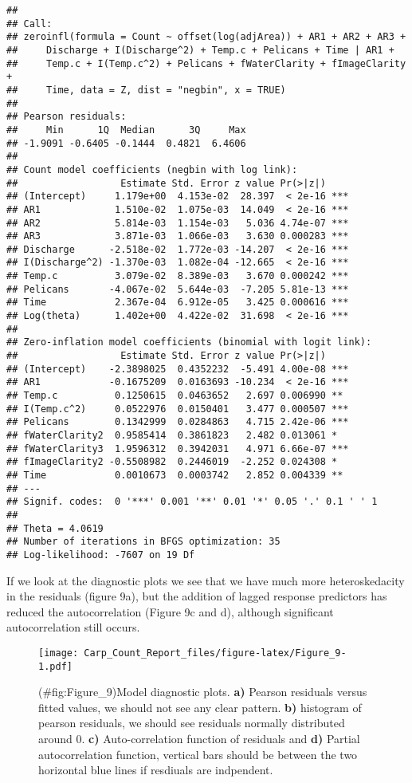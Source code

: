 \documentclass[]{article}
\begin{document}
\begin{verbatim}
## 
## Call:
## zeroinfl(formula = Count ~ offset(log(adjArea)) + AR1 + AR2 + AR3 + 
##     Discharge + I(Discharge^2) + Temp.c + Pelicans + Time | AR1 + 
##     Temp.c + I(Temp.c^2) + Pelicans + fWaterClarity + fImageClarity + 
##     Time, data = Z, dist = "negbin", x = TRUE)
## 
## Pearson residuals:
##     Min      1Q  Median      3Q     Max 
## -1.9091 -0.6405 -0.1444  0.4821  6.4606 
## 
## Count model coefficients (negbin with log link):
##                  Estimate Std. Error z value Pr(>|z|)    
## (Intercept)     1.179e+00  4.153e-02  28.397  < 2e-16 ***
## AR1             1.510e-02  1.075e-03  14.049  < 2e-16 ***
## AR2             5.814e-03  1.154e-03   5.036 4.74e-07 ***
## AR3             3.871e-03  1.066e-03   3.630 0.000283 ***
## Discharge      -2.518e-02  1.772e-03 -14.207  < 2e-16 ***
## I(Discharge^2) -1.370e-03  1.082e-04 -12.665  < 2e-16 ***
## Temp.c          3.079e-02  8.389e-03   3.670 0.000242 ***
## Pelicans       -4.067e-02  5.644e-03  -7.205 5.81e-13 ***
## Time            2.367e-04  6.912e-05   3.425 0.000616 ***
## Log(theta)      1.402e+00  4.422e-02  31.698  < 2e-16 ***
## 
## Zero-inflation model coefficients (binomial with logit link):
##                  Estimate Std. Error z value Pr(>|z|)    
## (Intercept)    -2.3898025  0.4352232  -5.491 4.00e-08 ***
## AR1            -0.1675209  0.0163693 -10.234  < 2e-16 ***
## Temp.c          0.1250615  0.0463652   2.697 0.006990 ** 
## I(Temp.c^2)     0.0522976  0.0150401   3.477 0.000507 ***
## Pelicans        0.1342999  0.0284863   4.715 2.42e-06 ***
## fWaterClarity2  0.9585414  0.3861823   2.482 0.013061 *  
## fWaterClarity3  1.9596312  0.3942031   4.971 6.66e-07 ***
## fImageClarity2 -0.5508982  0.2446019  -2.252 0.024308 *  
## Time            0.0010673  0.0003742   2.852 0.004339 ** 
## ---
## Signif. codes:  0 '***' 0.001 '**' 0.01 '*' 0.05 '.' 0.1 ' ' 1 
## 
## Theta = 4.0619 
## Number of iterations in BFGS optimization: 35 
## Log-likelihood: -7607 on 19 Df
\end{verbatim}

If we look at the diagnostic plots we see that we have much more
heteroskedacity in the residuals (figure 9a), but the addition of lagged
response predictors has reduced the autocorrelation (Figure 9c and d),
although significant autocorrelation still occurs.

\begin{figure}[htbp]
\centering
\texttt{[image: Carp\_Count\_Report\_files/figure-latex/Figure\_9-1.pdf]}
\caption{(\#fig:Figure\_9)Model diagnostic plots. \textbf{a)} Pearson
residuals versus fitted values, we should not see any clear pattern.
\textbf{b)} histogram of pearson residuals, we should see residuals
normally distributed around 0. \textbf{c)} Auto-correlation function of
residuals and \textbf{d)} Partial autocorrelation function, vertical
bars should be between the two horizontal blue lines if resdiuals are
indpendent.}
\end{figure}
\end{document}

